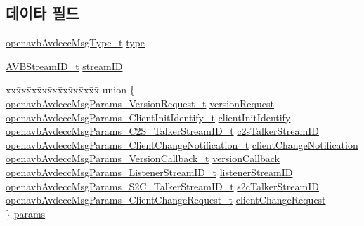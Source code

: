 \subsection*{데이타 필드}
\begin{DoxyCompactItemize}
\item 
\hyperlink{openavb__avdecc__msg_8h_a6d378fbc94d29fb8273795ebf8600b6a}{openavb\+Avdecc\+Msg\+Type\+\_\+t} \hyperlink{structopenavb_avdecc_message__t_ae93b36f3af793c202d59cd2edf50835b}{type}
\item 
\hyperlink{struct_a_v_b_stream_i_d__t}{A\+V\+B\+Stream\+I\+D\+\_\+t} \hyperlink{structopenavb_avdecc_message__t_a989c1ccd88811e9926203a07d587bc21}{stream\+ID}
\item 
\begin{tabbing}
xx\=xx\=xx\=xx\=xx\=xx\=xx\=xx\=xx\=\kill
union \{\\
\>\hyperlink{structopenavb_avdecc_msg_params___version_request__t}{openavbAvdeccMsgParams\_VersionRequest\_t} \hyperlink{structopenavb_avdecc_message__t_acb1dde86e7ec0d15978aa2a7c352458b}{versionRequest}\\
\>\hyperlink{structopenavb_avdecc_msg_params___client_init_identify__t}{openavbAvdeccMsgParams\_ClientInitIdentify\_t} \hyperlink{structopenavb_avdecc_message__t_aa2bb7838c4022f9b5a50759d88f0391e}{clientInitIdentify}\\
\>\hyperlink{structopenavb_avdecc_msg_params___c2_s___talker_stream_i_d__t}{openavbAvdeccMsgParams\_C2S\_TalkerStreamID\_t} \hyperlink{structopenavb_avdecc_message__t_a3a0cd9f16b0fb7012ebfd5ac7efbc9e0}{c2sTalkerStreamID}\\
\>\hyperlink{structopenavb_avdecc_msg_params___client_change_notification__t}{openavbAvdeccMsgParams\_ClientChangeNotification\_t} \hyperlink{structopenavb_avdecc_message__t_a0798a35d19be00d1d4cbba796b7c81c0}{clientChangeNotification}\\
\>\hyperlink{structopenavb_avdecc_msg_params___version_callback__t}{openavbAvdeccMsgParams\_VersionCallback\_t} \hyperlink{structopenavb_avdecc_message__t_a0ad469bdc533caff5f91bf43c15ed6bf}{versionCallback}\\
\>\hyperlink{structopenavb_avdecc_msg_params___listener_stream_i_d__t}{openavbAvdeccMsgParams\_ListenerStreamID\_t} \hyperlink{structopenavb_avdecc_message__t_a4d6e8a43085c7403645830b74c9b1c18}{listenerStreamID}\\
\>\hyperlink{structopenavb_avdecc_msg_params___s2_c___talker_stream_i_d__t}{openavbAvdeccMsgParams\_S2C\_TalkerStreamID\_t} \hyperlink{structopenavb_avdecc_message__t_a5a95678153298175f4f17004844025ca}{s2cTalkerStreamID}\\
\>\hyperlink{structopenavb_avdecc_msg_params___client_change_request__t}{openavbAvdeccMsgParams\_ClientChangeRequest\_t} \hyperlink{structopenavb_avdecc_message__t_adff547ff3c523035d6592584f0e5b3c6}{clientChangeRequest}\\
\} \hyperlink{structopenavb_avdecc_message__t_ac4afd7e03fbcb40085aff2fc50dc6df6}{params}\\

\end{tabbing}\end{DoxyCompactItemize}


